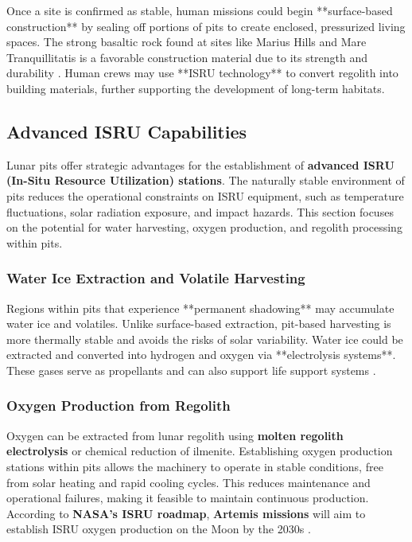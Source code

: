 Once a site is confirmed as stable, human missions could begin **surface-based construction** by sealing off portions of pits to create enclosed, pressurized living spaces. The strong basaltic rock found at sites like Marius Hills and Mare Tranquillitatis is a favorable construction material due to its strength and durability \cite{new-wagner}. Human crews may use **ISRU technology** to convert regolith into building materials, further supporting the development of long-term habitats.


\subsection{Advanced ISRU Capabilities}

Lunar pits offer strategic advantages for the establishment of \textbf{advanced ISRU (In-Situ Resource Utilization) stations}. The naturally stable environment of pits reduces the operational constraints on ISRU equipment, such as temperature fluctuations, solar radiation exposure, and impact hazards. This section focuses on the potential for water harvesting, oxygen production, and regolith processing within pits.


\subsubsection{Water Ice Extraction and Volatile Harvesting}

Regions within pits that experience **permanent shadowing** may accumulate water ice and volatiles. Unlike surface-based extraction, pit-based harvesting is more thermally stable and avoids the risks of solar variability. Water ice could be extracted and converted into hydrogen and oxygen via **electrolysis systems**. These gases serve as propellants and can also support life support systems \cite{jsanders-isru}.



\subsubsection{Oxygen Production from Regolith}

Oxygen can be extracted from lunar regolith using \textbf{molten regolith electrolysis} or chemical reduction of ilmenite. Establishing oxygen production stations within pits allows the machinery to operate in stable conditions, free from solar heating and rapid cooling cycles. This reduces maintenance and operational failures, making it feasible to maintain continuous production. According to \textbf{NASA's ISRU roadmap}, \textbf{Artemis missions} will aim to establish ISRU oxygen production on the Moon by the 2030s \cite{jsanders-isru}.

